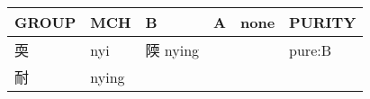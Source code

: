 \documentclass[14pt,a4paper]{scrartcl}
\begin{document}
\begin{longtable}[c]{@{}llllll@{}}
\toprule
\begin{minipage}[b]{0.14\columnwidth}\raggedright\strut
GROUP
\strut\end{minipage} &
\begin{minipage}[b]{0.14\columnwidth}\raggedright\strut
MCH
\strut\end{minipage} &
\begin{minipage}[b]{0.14\columnwidth}\raggedright\strut
B
\strut\end{minipage} &
\begin{minipage}[b]{0.14\columnwidth}\raggedright\strut
A
\strut\end{minipage} &
\begin{minipage}[b]{0.14\columnwidth}\raggedright\strut
none
\strut\end{minipage} &
\begin{minipage}[b]{0.14\columnwidth}\raggedright\strut
PURITY
\strut\end{minipage}\tabularnewline
\midrule
\endhead
\begin{minipage}[t]{0.14\columnwidth}\raggedright\strut
耎
\strut\end{minipage} &
\begin{minipage}[t]{0.14\columnwidth}\raggedright\strut
nyi
\strut\end{minipage} &
\begin{minipage}[t]{0.14\columnwidth}\raggedright\strut
陾 nying
\strut\end{minipage} &
\begin{minipage}[t]{0.14\columnwidth}\raggedright\strut
\strut\end{minipage} &
\begin{minipage}[t]{0.14\columnwidth}\raggedright\strut
\strut\end{minipage} &
\begin{minipage}[t]{0.14\columnwidth}\raggedright\strut
pure:B
\strut\end{minipage}\tabularnewline
\begin{minipage}[t]{0.14\columnwidth}\raggedright\strut
耐
\strut\end{minipage} &
\begin{minipage}[t]{0.14\columnwidth}\raggedright\strut
nying
\strut\end{minipage} &
\begin{minipage}[t]{0.14\columnwidth}\raggedright\strut
\strut\end{minipage} &
\begin{minipage}[t]{0.14\columnwidth}\raggedright\strut

\end{minipage}
\end{longtable}
\end{document}
